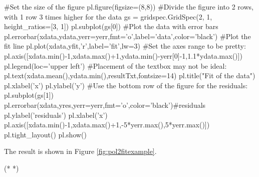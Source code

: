 \begin{python}[caption = A complete fit including residuals]
#Set the size of the figure
pl.figure(figsize=(8,8))
#Divide the figure into 2 rows, with 1 row 3 times higher for the data
gs = gridspec.GridSpec(2, 1, height_ratios=[3, 1])
pl.subplot(gs[0])
#Plot the data with error bars
pl.errorbar(xdata,ydata,yerr=yerr,fmt='o',label='data',color='black')
#Plot the fit line
pl.plot(xdata,yfit,'r',label='fit',lw=3)
#Set the axes range to be pretty:
pl.axis([xdata.min()-1,xdata.max()+1,ydata.min()-yerr[0]-1,1.1*ydata.max()])
pl.legend(loc='upper left')
#Placement of the textbox may not be ideal:
pl.text(xdata.mean(),ydata.min(),resultTxt,fontsize=14)
pl.title("Fit of the data")
pl.xlabel('x')
pl.ylabel('y')
#Use the bottom row of the figure for the residuals:
pl.subplot(gs[1])
pl.errorbar(xdata,yres,yerr=yerr,fmt='o',color='black')#residuals
pl.ylabel('residuals')
pl.xlabel('x')
pl.axis([xdata.min()-1,xdata.max()+1,-5*yerr.max(),5*yerr.max()])
pl.tight_layout()
pl.show()
\end{python}
The result is shown in Figure \ref{fig:pol2fitexample}.
\begin{poutput}
(*  *)
\end{poutput}
 